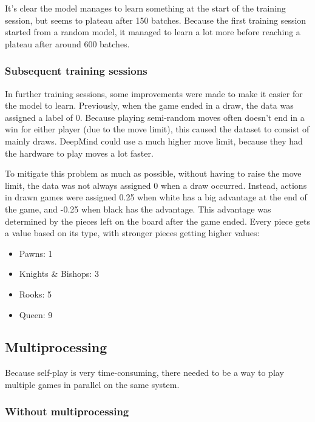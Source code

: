 \documentclass{article}
\begin{document}
It's clear the model manages to learn something at the start of the training session,
but seems to plateau after 150 batches. Because the first training session started from 
a random model, it managed to learn a lot more before reaching a plateau after around 600 batches.

\subsubsection{Subsequent training sessions}

In further training sessions, some improvements were made to make it easier for the model to learn.
Previously, when the game ended in a draw, the data was assigned a label of 0. 
Because playing semi-random moves often doesn't end in a win for either player (due to the move limit), 
this caused the dataset to consist of mainly draws. DeepMind could use a much higher move limit, 
because they had the hardware to play moves a lot faster.

To mitigate this problem as much as possible, without having to raise the move limit, 
the data was not always assigned 0 when a draw occurred. Instead, actions in 
drawn games were assigned 0.25 when white has a big advantage at the end of the game, and -0.25 
when black has the advantage. This advantage was determined by the pieces left on the board
after the game ended. Every piece gets a value based on its type, with stronger pieces getting 
higher values:

\begin{itemize}
    \item Pawns: 1
    \item Knights \& Bishops: 3
    \item Rooks: 5
    \item Queen: 9
\end{itemize}





\subsection{Multiprocessing}

Because self-play is very time-consuming, there needed to be a way to play multiple games in parallel 
on the same system.

\subsubsection{Without multiprocessing}
\end{document}
